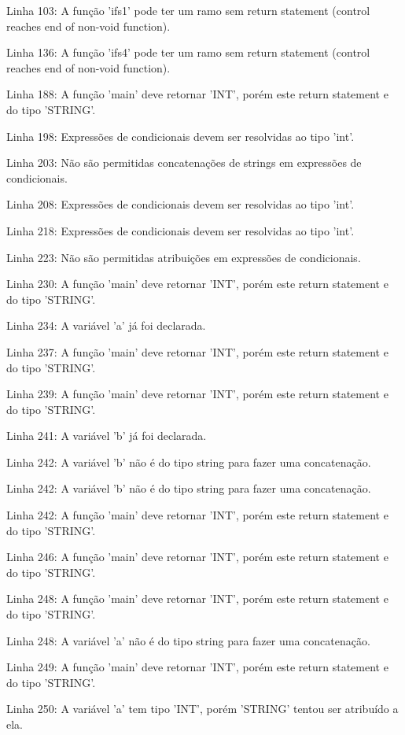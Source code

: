 \documentclass[12pt]{article}
\begin{document}
Linha 103: A função 'ifs1' pode ter um ramo sem return statement (control reaches end of non-void function).

Linha 136: A função 'ifs4' pode ter um ramo sem return statement (control reaches end of non-void function).

Linha 188: A função 'main' deve retornar 'INT', porém este return statement e do tipo 'STRING'.

Linha 198: Expressões de condicionais devem ser resolvidas ao tipo 'int'.

Linha 203: Não são permitidas concatenações de strings em expressões de condicionais.

Linha 208: Expressões de condicionais devem ser resolvidas ao tipo 'int'.

Linha 218: Expressões de condicionais devem ser resolvidas ao tipo 'int'.

Linha 223: Não são permitidas atribuições em expressões de condicionais.

Linha 230: A função 'main' deve retornar 'INT', porém este return statement e do tipo 'STRING'.

Linha 234: A variável 'a' já foi declarada.

Linha 237: A função 'main' deve retornar 'INT', porém este return statement e do tipo 'STRING'.

Linha 239: A função 'main' deve retornar 'INT', porém este return statement e do tipo 'STRING'.

Linha 241: A variável 'b' já foi declarada.

Linha 242: A variável 'b' não é do tipo string para fazer uma concatenação.

Linha 242: A variável 'b' não é do tipo string para fazer uma concatenação.

Linha 242: A função 'main' deve retornar 'INT', porém este return statement e do tipo 'STRING'.

Linha 246: A função 'main' deve retornar 'INT', porém este return statement e do tipo 'STRING'.

Linha 248: A função 'main' deve retornar 'INT', porém este return statement e do tipo 'STRING'.

Linha 248: A variável 'a' não é do tipo string para fazer uma concatenação.

Linha 249: A função 'main' deve retornar 'INT', porém este return statement e do tipo 'STRING'.

Linha 250: A variável 'a' tem tipo 'INT', porém 'STRING' tentou ser atribuído a ela.
\end{document}
